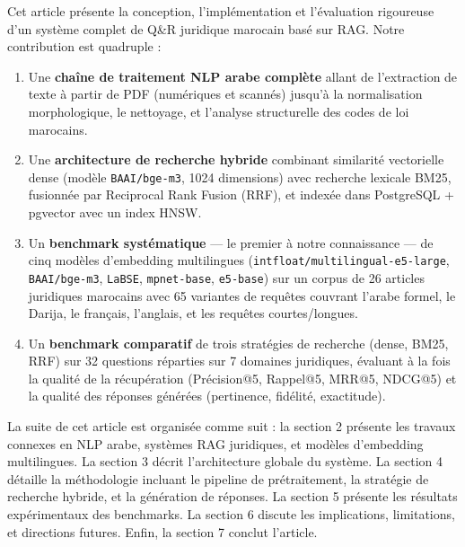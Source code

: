 \vspace{0.2cm}

\noindent Cet article présente la conception, l'implémentation et l'évaluation
rigoureuse d'un système complet de Q\&R juridique marocain basé sur RAG. Notre
contribution est quadruple :

\begin{enumerate}
    \item Une \textbf{chaîne de traitement NLP arabe complète} allant de
    l'extraction de texte à partir de PDF (numériques et scannés) jusqu'à la
    normalisation morphologique, le nettoyage, et l'analyse structurelle des
    codes de loi marocains.
    \item Une \textbf{architecture de recherche hybride} combinant similarité
    vectorielle dense (modèle \texttt{BAAI/bge-m3}, 1024 dimensions) avec
    recherche lexicale BM25, fusionnée par Reciprocal Rank Fusion (RRF), et
    indexée dans PostgreSQL + pgvector avec un index HNSW.
    \item Un \textbf{benchmark systématique} — le premier à notre connaissance
    — de cinq modèles d'embedding multilingues (\texttt{intfloat/multilingual-e5-large},
    \texttt{BAAI/bge-m3}, \texttt{LaBSE}, \texttt{mpnet-base}, \texttt{e5-base})
    sur un corpus de 26 articles juridiques marocains avec 65 variantes de
    requêtes couvrant l'arabe formel, le Darija, le français, l'anglais, et
    les requêtes courtes/longues.
    \item Un \textbf{benchmark comparatif} de trois stratégies de recherche
    (dense, BM25, RRF) sur 32 questions réparties sur 7 domaines juridiques,
    évaluant à la fois la qualité de la récupération (Précision@5, Rappel@5,
    MRR@5, NDCG@5) et la qualité des réponses générées (pertinence, fidélité,
    exactitude).
\end{enumerate}

\vspace{0.2cm}

\noindent La suite de cet article est organisée comme suit : la section 2
présente les travaux connexes en NLP arabe, systèmes RAG juridiques, et
modèles d'embedding multilingues. La section 3 décrit l'architecture globale
du système. La section 4 détaille la méthodologie incluant le pipeline de
prétraitement, la stratégie de recherche hybride, et la génération de réponses.
La section 5 présente les résultats expérimentaux des benchmarks. La section 6
discute les implications, limitations, et directions futures. Enfin, la section
7 conclut l'article.